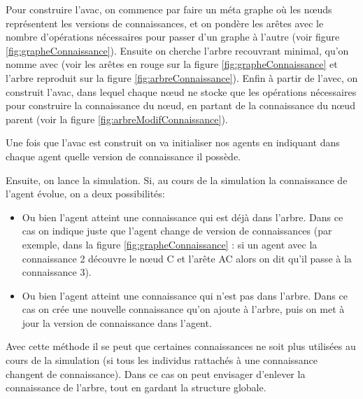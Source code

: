 \documentclass[a4paper]{article}
\begin{document}
Pour construire l'\gls{avac}, on commence par faire un méta graphe où les nœuds
représentent les versions de connaissances, et on pondère les arêtes avec le
nombre d'opérations nécessaires pour passer d'un graphe à l'autre (voir figure
\ref{fig:grapheConnaissance}). Ensuite on cherche l'arbre recouvrant minimal,
qu'on nomme \gls{avec} (voir les arêtes en rouge sur la figure
\ref{fig:grapheConnaissance} et l'arbre reproduit sur la figure
\ref{fig:arbreConnaissance}). Enfin à partir de l'\gls{avec}, on construit
l'\gls{avac}, dans lequel chaque nœud ne stocke que les opérations nécessaires
pour construire la connaissance du nœud, en partant de la connaissance du nœud
parent (voir la figure \ref{fig:arbreModifConnaissance}).

Une fois que l'\gls{avac} est construit on va initialiser nos agents en
indiquant dans chaque agent quelle version de connaissance il possède.

Ensuite, on lance la simulation. Si, au cours de la simulation la
connaissance de l'agent évolue, on a deux possibilités:

\begin{itemize}

  \item Ou bien l'agent atteint une connaissance qui est déjà dans l'arbre. Dans
    ce cas on indique juste que l'agent change de version de connaissances (par
    exemple, dans la figure \ref{fig:grapheConnaissance} : si un agent avec la
    connaissance 2 découvre le nœud C et l'arête AC alors on dit qu'il passe à
    la connaissance 3).

  \item Ou bien l'agent atteint une connaissance qui n'est pas dans l'arbre.
    Dans ce cas on crée une nouvelle connaissance qu'on ajoute à l'arbre, puis
    on met à jour la version de connaissance dans l'agent.

\end{itemize}

Avec cette méthode il se peut que certaines connaissances ne soit plus utilisées
au cours de la simulation (si tous les individus rattachés à une connaissance
changent de connaissance). Dans ce cas on peut envisager d'enlever la
connaissance de l'arbre, tout en gardant la structure globale.
\end{document}
